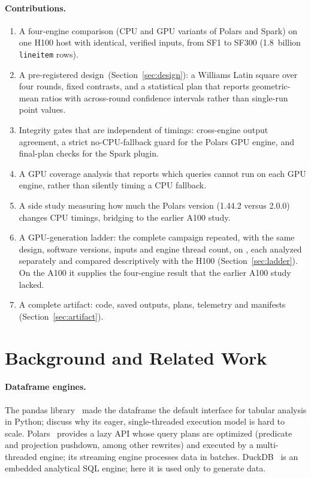 \documentclass[11pt]{article}
\begin{document}
\paragraph{Contributions.}
\begin{enumerate}[leftmargin=*,itemsep=2pt]
  \item A four-engine comparison (CPU and GPU variants of Polars and Spark) on
    one H100 host with identical, verified inputs, from SF1 to SF300
    (1.8~billion \texttt{lineitem} rows).
  \item A pre-registered design~(Section~\ref{sec:design}): a Williams Latin
    square over four rounds, fixed contrasts, and a statistical plan that
    reports geometric-mean ratios with across-round confidence intervals rather
    than single-run point values.
  \item Integrity gates that are independent of timings: cross-engine output
    agreement, a strict no-CPU-fallback guard for the Polars GPU engine, and
    final-plan checks for the Spark plugin.
  \item A GPU coverage analysis that reports which queries cannot run on each
    GPU engine, rather than silently timing a CPU fallback.
  \item A side study measuring how much the Polars version (1.44.2 versus
    2.0.0) changes CPU timings, bridging to the earlier A100 study.
\ifladderran
  \item A GPU-generation ladder: the complete campaign repeated, with the same
    design, software versions, inputs and engine thread count, on
    , each analyzed separately and compared
    descriptively with the H100 (Section~\ref{sec:ladder}).
\ifaonehundredran
    On the A100 it supplies the four-engine result that the earlier A100
    study lacked.
\fi
\fi
  \item A complete artifact: code, saved outputs, plans, telemetry and
    manifests (Section~\ref{sec:artifact}).
\end{enumerate}

\section{Background and Related Work}
\label{sec:background}

\paragraph{Dataframe engines.} The pandas library~\citep{mckinney2010pandas}
made the dataframe the default interface for tabular analysis in Python;
\citet{petersohn2020dataframes} discuss why its eager, single-threaded execution
model is hard to scale. Polars~\citep{polars1442,polars200} provides a lazy API
whose query plans are optimized (predicate and projection pushdown, among other
rewrites) and executed by a multi-threaded engine; its streaming engine
processes data in batches. DuckDB~\citep{raasveldt2019duckdb} is an embedded
analytical SQL engine; here it is used only to generate data.
\end{document}
